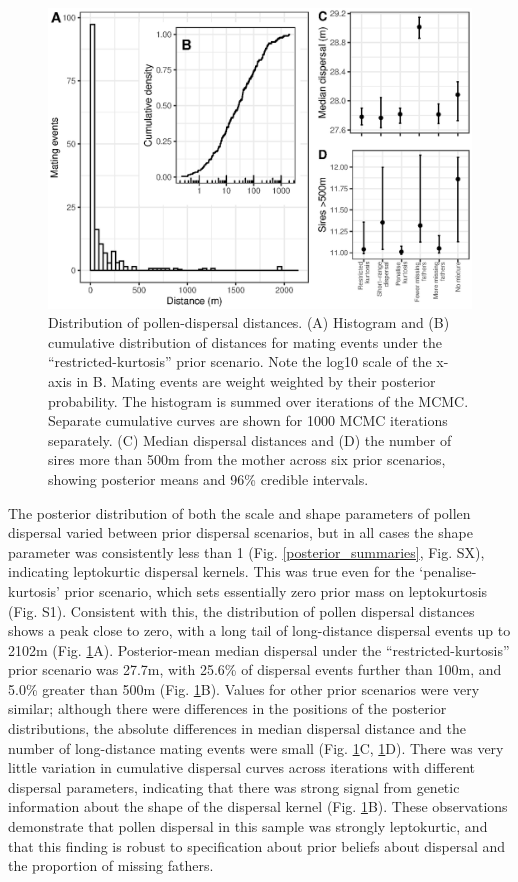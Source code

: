 \documentclass[10pt, a4paper, twocolumn]{article} %
\begin{document}
\begin{figure}
    \centering
    \includegraphics{dispersal.eps}
    \caption{Distribution of pollen-dispersal distances.  (A) Histogram and (B) cumulative distribution of distances for mating events under the “restricted-kurtosis” prior scenario. Note the log10 scale of the x-axis in B. Mating events are weight weighted by their posterior probability. The histogram is summed over iterations of the MCMC. Separate cumulative curves are shown for 1000 MCMC iterations separately. (C) Median dispersal distances and (D) the number of sires more than 500m from the mother across six prior scenarios, showing posterior means and 96\% credible intervals.}
    \label{fig:dispersal}
\end{figure}

The posterior distribution of both the scale and shape parameters of pollen dispersal varied between prior dispersal scenarios, but in all cases the shape parameter was consistently less than 1 (Fig. \ref{posterior_summaries}, Fig. SX), indicating leptokurtic dispersal kernels. This was true even for the ‘penalise-kurtosis’ prior scenario, which sets essentially zero prior mass on leptokurtosis (Fig. S1). Consistent with this, the distribution of pollen dispersal distances shows a peak close to zero, with a long tail of long-distance dispersal events up to 2102m (Fig. \ref{fig:dispersal}A). Posterior-mean median dispersal under the “restricted-kurtosis” prior scenario was 27.7m, with 25.6\% of dispersal events further than 100m, and 5.0\% greater than 500m (Fig. \ref{fig:dispersal}B). Values for other prior scenarios were very similar; although there were differences in the positions of the posterior distributions, the absolute differences in median dispersal distance and the number of long-distance mating events were small (Fig. \ref{fig:dispersal}C, \ref{fig:dispersal}D). There was very little variation in cumulative dispersal curves across iterations with different dispersal parameters, indicating that there was strong signal from genetic information about the shape of the dispersal kernel (Fig. \ref{fig:dispersal}B). These observations demonstrate that pollen dispersal in this sample was strongly leptokurtic, and that this finding is robust to specification about prior beliefs about dispersal and the proportion of missing fathers.
\end{document}
